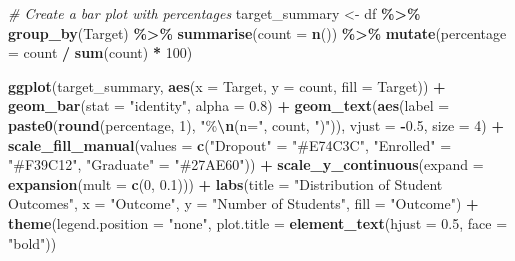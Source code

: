 \documentclass[
]{article}
\newenvironment{Shaded}{\begin{snugshade}}{\end{snugshade}}
\newcommand{\AttributeTok}[1]{\textcolor[rgb]{0.13,0.29,0.53}{#1}}
\newcommand{\CommentTok}[1]{\textcolor[rgb]{0.56,0.35,0.01}{\textit{#1}}}
\newcommand{\DecValTok}[1]{\textcolor[rgb]{0.00,0.00,0.81}{#1}}
\newcommand{\FloatTok}[1]{\textcolor[rgb]{0.00,0.00,0.81}{#1}}
\newcommand{\FunctionTok}[1]{\textcolor[rgb]{0.13,0.29,0.53}{\textbf{#1}}}
\newcommand{\NormalTok}[1]{#1}
\newcommand{\OtherTok}[1]{\textcolor[rgb]{0.56,0.35,0.01}{#1}}
\newcommand{\SpecialCharTok}[1]{\textcolor[rgb]{0.81,0.36,0.00}{\textbf{#1}}}
\newcommand{\StringTok}[1]{\textcolor[rgb]{0.31,0.60,0.02}{#1}}
\newcounter{none} %
\begin{document}
\begin{Shaded}
\begin{Highlighting}[]
\CommentTok{\# Create a bar plot with percentages}
\NormalTok{target\_summary }\OtherTok{\textless{}{-}}\NormalTok{ df }\SpecialCharTok{\%\textgreater{}\%}
  \FunctionTok{group\_by}\NormalTok{(Target) }\SpecialCharTok{\%\textgreater{}\%}
  \FunctionTok{summarise}\NormalTok{(}\AttributeTok{count =} \FunctionTok{n}\NormalTok{()) }\SpecialCharTok{\%\textgreater{}\%}
  \FunctionTok{mutate}\NormalTok{(}\AttributeTok{percentage =}\NormalTok{ count }\SpecialCharTok{/} \FunctionTok{sum}\NormalTok{(count) }\SpecialCharTok{*} \DecValTok{100}\NormalTok{)}

\FunctionTok{ggplot}\NormalTok{(target\_summary, }\FunctionTok{aes}\NormalTok{(}\AttributeTok{x =}\NormalTok{ Target, }\AttributeTok{y =}\NormalTok{ count, }\AttributeTok{fill =}\NormalTok{ Target)) }\SpecialCharTok{+}
  \FunctionTok{geom\_bar}\NormalTok{(}\AttributeTok{stat =} \StringTok{"identity"}\NormalTok{, }\AttributeTok{alpha =} \FloatTok{0.8}\NormalTok{) }\SpecialCharTok{+}
  \FunctionTok{geom\_text}\NormalTok{(}\FunctionTok{aes}\NormalTok{(}\AttributeTok{label =} \FunctionTok{paste0}\NormalTok{(}\FunctionTok{round}\NormalTok{(percentage, }\DecValTok{1}\NormalTok{), }\StringTok{"\%}\SpecialCharTok{\textbackslash{}n}\StringTok{(n="}\NormalTok{, count, }\StringTok{")"}\NormalTok{)),}
            \AttributeTok{vjust =} \SpecialCharTok{{-}}\FloatTok{0.5}\NormalTok{, }\AttributeTok{size =} \DecValTok{4}\NormalTok{) }\SpecialCharTok{+}
  \FunctionTok{scale\_fill\_manual}\NormalTok{(}\AttributeTok{values =} \FunctionTok{c}\NormalTok{(}\StringTok{"Dropout"} \OtherTok{=} \StringTok{"\#E74C3C"}\NormalTok{,}
                                \StringTok{"Enrolled"} \OtherTok{=} \StringTok{"\#F39C12"}\NormalTok{,}
                                \StringTok{"Graduate"} \OtherTok{=} \StringTok{"\#27AE60"}\NormalTok{)) }\SpecialCharTok{+}
  \FunctionTok{scale\_y\_continuous}\NormalTok{(}\AttributeTok{expand =} \FunctionTok{expansion}\NormalTok{(}\AttributeTok{mult =} \FunctionTok{c}\NormalTok{(}\DecValTok{0}\NormalTok{, }\FloatTok{0.1}\NormalTok{))) }\SpecialCharTok{+}
  \FunctionTok{labs}\NormalTok{(}\AttributeTok{title =} \StringTok{"Distribution of Student Outcomes"}\NormalTok{,}
       \AttributeTok{x =} \StringTok{"Outcome"}\NormalTok{, }\AttributeTok{y =} \StringTok{"Number of Students"}\NormalTok{, }\AttributeTok{fill =} \StringTok{"Outcome"}\NormalTok{) }\SpecialCharTok{+}
  \FunctionTok{theme}\NormalTok{(}\AttributeTok{legend.position =} \StringTok{"none"}\NormalTok{,}
        \AttributeTok{plot.title =} \FunctionTok{element\_text}\NormalTok{(}\AttributeTok{hjust =} \FloatTok{0.5}\NormalTok{, }\AttributeTok{face =} \StringTok{"bold"}\NormalTok{))}
\end{Highlighting}
\end{Shaded}
\end{document}
